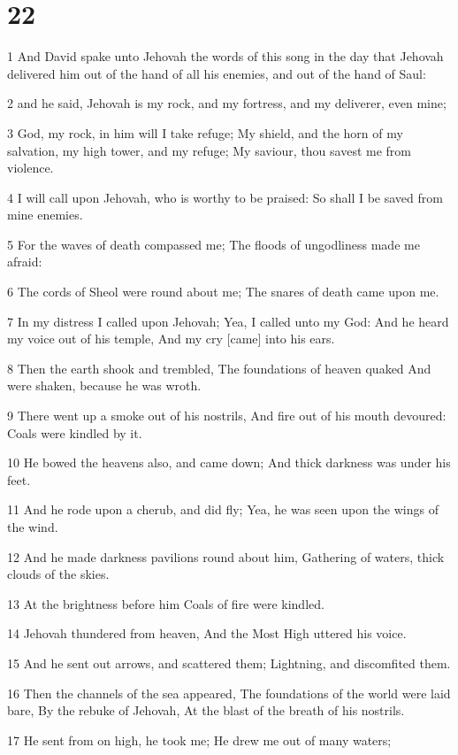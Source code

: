 \chapter{22}

\par 1 And David spake unto Jehovah the words of this song in the day that Jehovah delivered him out of the hand of all his enemies, and out of the hand of Saul:
\par 2 and he said, Jehovah is my rock, and my fortress, and my deliverer, even mine;
\par 3 God, my rock, in him will I take refuge; My shield, and the horn of my salvation, my high tower, and my refuge; My saviour, thou savest me from violence.
\par 4 I will call upon Jehovah, who is worthy to be praised: So shall I be saved from mine enemies.
\par 5 For the waves of death compassed me; The floods of ungodliness made me afraid:
\par 6 The cords of Sheol were round about me; The snares of death came upon me.
\par 7 In my distress I called upon Jehovah; Yea, I called unto my God: And he heard my voice out of his temple, And my cry [came] into his ears.
\par 8 Then the earth shook and trembled, The foundations of heaven quaked And were shaken, because he was wroth.
\par 9 There went up a smoke out of his nostrils, And fire out of his mouth devoured: Coals were kindled by it.
\par 10 He bowed the heavens also, and came down; And thick darkness was under his feet.
\par 11 And he rode upon a cherub, and did fly; Yea, he was seen upon the wings of the wind.
\par 12 And he made darkness pavilions round about him, Gathering of waters, thick clouds of the skies.
\par 13 At the brightness before him Coals of fire were kindled.
\par 14 Jehovah thundered from heaven, And the Most High uttered his voice.
\par 15 And he sent out arrows, and scattered them; Lightning, and discomfited them.
\par 16 Then the channels of the sea appeared, The foundations of the world were laid bare, By the rebuke of Jehovah, At the blast of the breath of his nostrils.
\par 17 He sent from on high, he took me; He drew me out of many waters;
